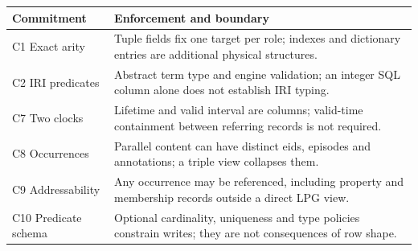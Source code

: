 \documentclass[11pt]{article}
\theoremstyle{plain}
\theoremstyle{definition}
\theoremstyle{remark}
\begin{document}
\begin{table}[h]
\centering\small
\begin{tabular}{@{}L{3.6cm}L{10.6cm}@{}}
\toprule
Commitment & Enforcement and boundary \\
\midrule
C1 Exact arity & Tuple fields fix one target per role; indexes and dictionary entries are additional physical structures. \\
C2 IRI predicates & Abstract term type and engine validation; an integer SQL column alone does not establish IRI typing. \\
C7 Two clocks & Lifetime and valid interval are columns; valid-time containment between referring records is not required. \\
C8 Occurrences & Parallel content can have distinct eids, episodes and annotations; a triple view collapses them. \\
C9 Addressability & Any occurrence may be referenced, including property and membership records outside a direct LPG view. \\
C10 Predicate schema & Optional cardinality, uniqueness and type policies constrain writes; they are not consequences of row shape. \\
\bottomrule
\end{tabular}
\end{table}



\end{document}

